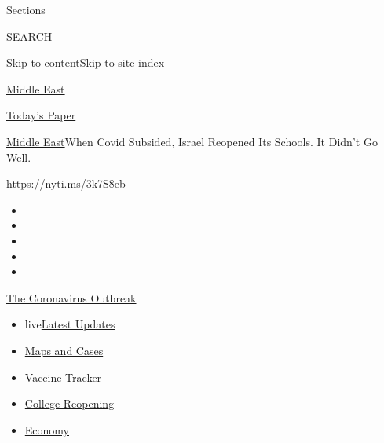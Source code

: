Sections

SEARCH

\protect\hyperlink{site-content}{Skip to
content}\protect\hyperlink{site-index}{Skip to site index}

\href{https://www.nytimes.com/section/world/middleeast}{Middle East}

\href{https://myaccount.nytimes.com/auth/login?response_type=cookie\&client_id=vi}{}

\href{https://www.nytimes.com/section/todayspaper}{Today's Paper}

\href{/section/world/middleeast}{Middle East}\textbar{}When Covid
Subsided, Israel Reopened Its Schools. It Didn't Go Well.

\url{https://nyti.ms/3k7S8eb}

\begin{itemize}
\item
\item
\item
\item
\item
\end{itemize}

\href{https://www.nytimes.com/news-event/coronavirus?action=click\&pgtype=Article\&state=default\&region=TOP_BANNER\&context=storylines_menu}{The
Coronavirus Outbreak}

\begin{itemize}
\tightlist
\item
  live\href{https://www.nytimes.com/2020/08/03/world/coronavirus-covid-19.html?action=click\&pgtype=Article\&state=default\&region=TOP_BANNER\&context=storylines_menu}{Latest
  Updates}
\item
  \href{https://www.nytimes.com/interactive/2020/us/coronavirus-us-cases.html?action=click\&pgtype=Article\&state=default\&region=TOP_BANNER\&context=storylines_menu}{Maps
  and Cases}
\item
  \href{https://www.nytimes.com/interactive/2020/science/coronavirus-vaccine-tracker.html?action=click\&pgtype=Article\&state=default\&region=TOP_BANNER\&context=storylines_menu}{Vaccine
  Tracker}
\item
  \href{https://www.nytimes.com/2020/08/02/us/covid-college-reopening.html?action=click\&pgtype=Article\&state=default\&region=TOP_BANNER\&context=storylines_menu}{College
  Reopening}
\item
  \href{https://www.nytimes.com/live/2020/08/03/business/stock-market-today-coronavirus?action=click\&pgtype=Article\&state=default\&region=TOP_BANNER\&context=storylines_menu}{Economy}
\end{itemize}

